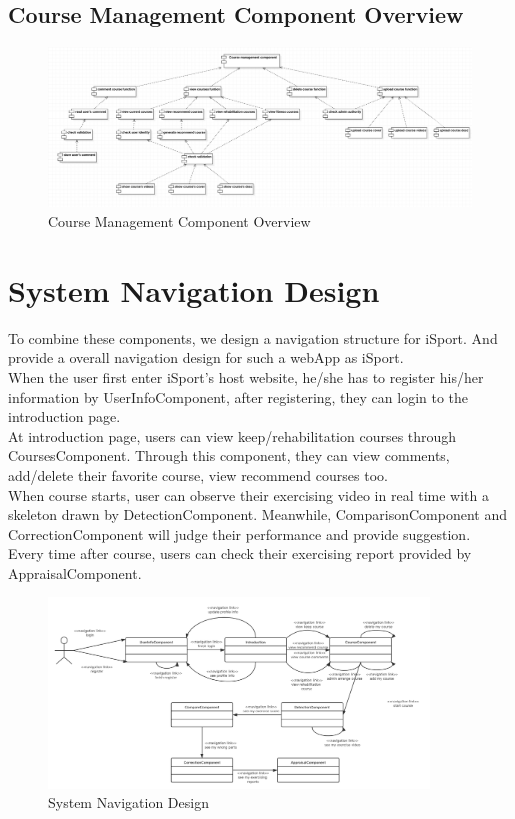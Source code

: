 \documentclass[16pt]{scrreprt}
\begin{document}
\subsection{Course Management Component Overview}
\begin{figure}[H]
    \centering
    \includegraphics[width=1\textwidth]{diagrams/course-management.png}
    \caption{Course Management Component Overview}
\end{figure}

\section{System Navigation Design}
To combine these components, we design a navigation structure for iSport. And provide a overall navigation design for such a webApp as iSport. \\

\noindent When the user first enter iSport's host website, he/she has to register his/her information by UserInfoComponent, after registering, they can login to the introduction page.\\

\noindent At introduction page, users can view keep/rehabilitation courses through CoursesComponent. Through this component, they can view comments, add/delete their favorite course, view recommend courses too.\\

\noindent When course starts, user can observe their exercising video in real time with a skeleton drawn by DetectionComponent. Meanwhile, ComparisonComponent and CorrectionComponent will judge their performance and provide suggestion.\\

\noindent Every time after course, users can check their exercising report provided by AppraisalComponent.  
\begin{figure}[H]
  \centering
  \includegraphics[width=0.9\textwidth]{diagrams/navigation.png}
  \caption{System Navigation Design}
\end{figure}
\end{document}
